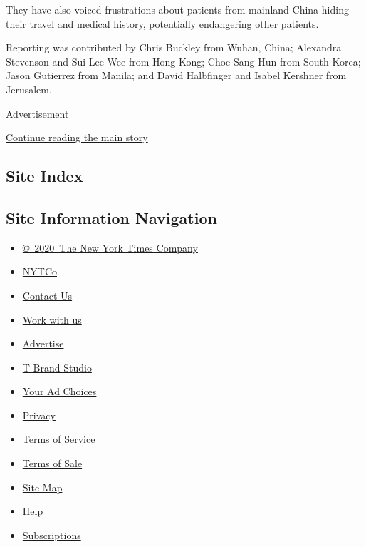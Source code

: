 They have also voiced frustrations about patients from mainland China
hiding their travel and medical history, potentially endangering other
patients.

Reporting was contributed by Chris Buckley from Wuhan, China; Alexandra
Stevenson and Sui-Lee Wee from Hong Kong; Choe Sang-Hun from South
Korea; Jason Gutierrez from Manila; and David Halbfinger and Isabel
Kershner from Jerusalem.

Advertisement

\protect\hyperlink{after-bottom}{Continue reading the main story}

\hypertarget{site-index}{%
\subsection{Site Index}\label{site-index}}

\hypertarget{site-information-navigation}{%
\subsection{Site Information
Navigation}\label{site-information-navigation}}

\begin{itemize}
\tightlist
\item
  \href{https://help.nytimes.com/hc/en-us/articles/115014792127-Copyright-notice}{©~2020~The
  New York Times Company}
\end{itemize}

\begin{itemize}
\tightlist
\item
  \href{https://www.nytco.com/}{NYTCo}
\item
  \href{https://help.nytimes.com/hc/en-us/articles/115015385887-Contact-Us}{Contact
  Us}
\item
  \href{https://www.nytco.com/careers/}{Work with us}
\item
  \href{https://nytmediakit.com/}{Advertise}
\item
  \href{http://www.tbrandstudio.com/}{T Brand Studio}
\item
  \href{https://www.nytimes.com/privacy/cookie-policy\#how-do-i-manage-trackers}{Your
  Ad Choices}
\item
  \href{https://www.nytimes.com/privacy}{Privacy}
\item
  \href{https://help.nytimes.com/hc/en-us/articles/115014893428-Terms-of-service}{Terms
  of Service}
\item
  \href{https://help.nytimes.com/hc/en-us/articles/115014893968-Terms-of-sale}{Terms
  of Sale}
\item
  \href{https://spiderbites.nytimes.com}{Site Map}
\item
  \href{https://help.nytimes.com/hc/en-us}{Help}
\item
  \href{https://www.nytimes.com/subscription?campaignId=37WXW}{Subscriptions}
\end{itemize}
